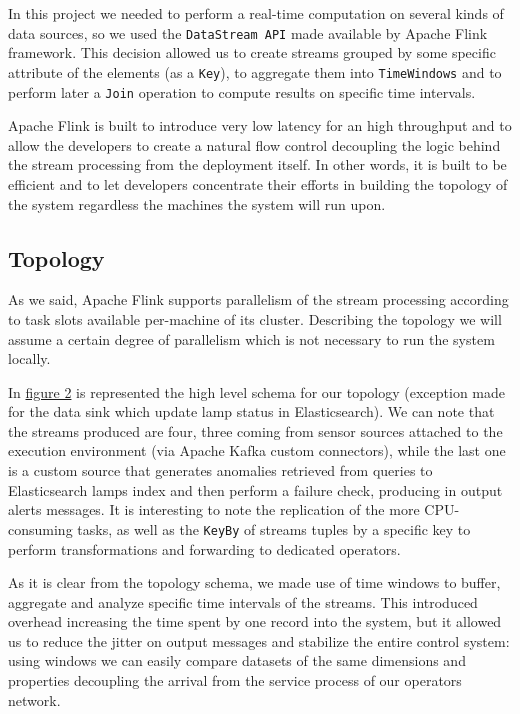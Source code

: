 In this project we needed to perform a real-time computation on several kinds of data sources, so we used the \texttt{DataStream API} made available by Apache Flink framework. This decision allowed us to create streams grouped by some specific attribute of the elements (as a \texttt{Key}), to aggregate them into \texttt{TimeWindows} and to perform later a \texttt{Join} operation to compute results on specific time intervals. 

Apache Flink is built to introduce very low latency for an high throughput and to allow the developers to create a natural flow control decoupling the logic behind the stream processing from the deployment itself. In other words, it is built to be efficient and to let developers concentrate their efforts in building the topology of the system regardless the machines the system will run upon.

\subsection{Topology}
As we said, Apache Flink supports parallelism of the stream processing according to task slots available per-machine of its cluster. Describing the topology we will assume a certain degree of parallelism which is not necessary to run the system locally.

In \hyperref[fig:ember_topology]{figure 2} is represented the high level schema for our topology (exception made for the data sink which update lamp status in Elasticsearch). We can note that the streams produced are four, three coming from sensor sources attached to the execution environment (via Apache Kafka custom connectors), while the last one is a custom source that generates anomalies retrieved from queries to Elasticsearch lamps index and then perform a failure check, producing in output alerts messages.
It is interesting to note the replication of the more CPU-consuming tasks, as well as the \texttt{KeyBy} of streams tuples by a specific key to perform transformations and forwarding to dedicated operators.

As it is clear from the topology schema, we made use of time windows to buffer, aggregate and analyze specific time intervals of the streams. This introduced overhead increasing the time spent by one record into the system, but it allowed us to reduce the jitter on output messages and stabilize the entire control system: using windows we can easily compare datasets of the same dimensions and properties decoupling the arrival from the service process of our operators network.

